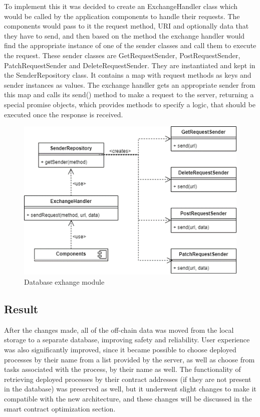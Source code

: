 To implement this it was decided to create an ExchangeHandler class which would be called by the application components to handle their requests. The components would pass to it the request method, URI and optionally data that they have to send, and then based on the method the exchange handler would find the appropriate instance of one of the sender classes and call them to execute the request. These sender classes are GetRequestSender, PostRequestSender, PatchRequestSender and DeleteRequestSender. They are instantiated and kept in the SenderRepository class. It contains a map with request methods as keys and sender instances as values. The exchange handler gets an appropriate sender from this map and calls its send() method to make a request to the server, returning a special promise objects, which provides methods to specify a logic, that should be executed once the response is received.


\begin{figure}[hbt]
	\includegraphics[width=\textwidth]{gfx/persistence_exchange}
	\caption{Database exhange module}
	\label{fig:impr:persistence:exchange}
\end{figure}

\subsection{Result}
\label{sec:impr:persistence:result}

After the changes made, all of the off-chain data was moved from the local storage to a separate database, improving safety and reliability. User experience was also significantly improved, since it became possible to choose deployed processes by their name from a list provided by the server, as well as choose from tasks associated with the process, by their name as well. The functionality of retrieving deployed processes by their contract addresses (if they are not present in the database) was preserved as well, but it underwent slight changes to make it compatible with the new architecture, and these changes will be discussed in the smart contract optimization section.

